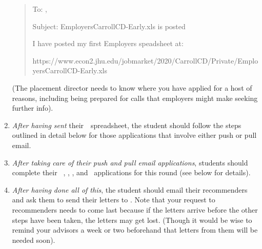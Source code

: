 \documentclass{\classes/econtex}
\newcommand\redout{\bgroup\markoverwith
  {\textcolor{red}{\rule[.5ex]{2pt}{1pt}}}\ULon}
\begin{document}
\begin{enumerate}
  \begin{quote}
    \begin{texttt}
      To: \jmstaffemail , \JMPOEmail
      
      Subject: EmployersCarrollCD-Early.xls is posted

      \indent I have posted my first Employers speadsheet at:

      https://www.econ2.jhu.edu/jobmarket/2020/CarrollCD/Private/EmployersCarrollCD-Early.xls
      
    \end{texttt}
  \end{quote}    

  (The placement director needs to know where you have applied for a host of reasons, including being prepared for calls that employers might make seeking further info).


\item \textit{After having sent} their~{\EMW}~spreadsheet, the student
  should follow the steps outlined in detail below for those
  applications that involve either push or pull email.

\item \textit{After taking care of their push and pull email applications}, students should complete their {\EJM}~, \AJO, \AEA, and \Interfolio~applications for this round (see below for details).

\item \textit{After having done all of this}, the student should email
  their recommenders and ask them to send their letters to
  \jmstaffemail.  Note that your request to recommenders needs to come
  last because if the letters arrive before the other steps have been
  taken, the letters may get lost.  (Though it would be wise to remind
  your advisors a week or two beforehand that letters from them will
  be needed soon).

\end{enumerate}
\end{document}
